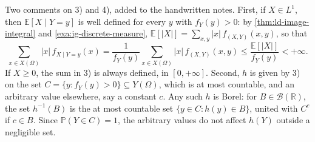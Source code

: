 Two comments on 3) and 4), added to the handwritten notes. First, if $X\in L^1$, then
$\mathbb E[X\mid Y=y]$ is well defined for every $y$ with $f_Y(y)>0$: by
\cref{thm:ld-image-integral} and \cref{exa:ig-discrete-measure},
$\mathbb E[|X|]=\sum_{x,y}|x|\,f_{(X,Y)}(x,y)$, so that
\[
  \sum_{x\in X(\Omega)}|x|\,f_{X\mid Y=y}(x)=\frac1{f_Y(y)}\sum_{x\in X(\Omega)}|x|\,f_{(X,Y)}(x,y)
  \le\frac{\mathbb E[|X|]}{f_Y(y)}<+\infty .
\]
If $X\ge0$, the sum in 3) is always defined, in $[0,+\infty]$. Second, $h$ is given by 3) on the
set $C=\{y:f_Y(y)>0\}\subseteq Y(\Omega)$, which is at most countable, and an arbitrary value
elsewhere, say a constant $c$. Any such $h$ is Borel: for $B\in\mathcal B(\mathbb R)$, the set
$h^{-1}(B)$ is the at most countable set $\{y\in C:h(y)\in B\}$, united with $C^c$ if $c\in B$.
Since $\mathbb P(Y\in C)=1$, the arbitrary values do not affect $h(Y)$ outside a negligible set.

